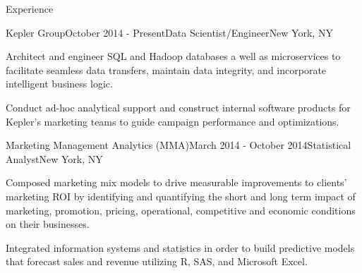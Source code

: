 \documentclass{resume} %
\begin{document}
\begin{rSection}{Experience}

\begin{rSubsection}{Kepler Group}{October 2014 - Present}{Data Scientist/Engineer}{New York, NY}
\item Architect and engineer SQL and Hadoop databases a well as microservices to facilitate seamless data transfers, maintain data integrity, and incorporate intelligent business logic.
\item Conduct ad-hoc analytical support and construct internal software products for Kepler's marketing teams to guide campaign performance and optimizations.
\end{rSubsection}


\begin{rSubsection}{Marketing Management Analytics (MMA)}{March 2014 - October 2014}{Statistical Analyst}{New York, NY}
\item Composed marketing mix models to drive measurable improvements to clients' marketing ROI by identifying and quantifying the short and long term impact of marketing, promotion, pricing, operational, competitive and economic conditions on their businesses.
\item Integrated information systems and statistics in order to build predictive models that forecast sales and revenue utilizing R, SAS, and Microsoft Excel.
\end{rSubsection}



\end{rSection}
\end{document}
